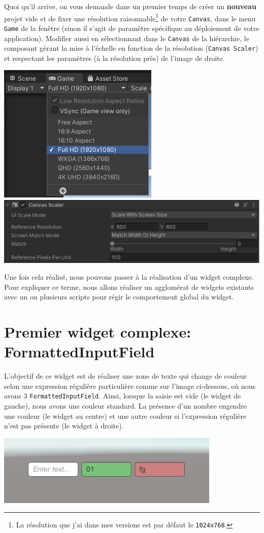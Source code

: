 \documentclass[a4paper,10pt]{article}
\begin{document}
Quoi qu'il arrive, on vous demande dans un premier temps de créer un \textbf{nouveau} projet vide et de fixer une résolution raisonnable\footnote{La résolution que j'ai dans mes versions est par défaut le \texttt{1024x768}.} de votre \texttt{Canvas}, dans le menu \texttt{Game} de la fenêtre (sinon il s'agit de paramètre spécifique au déploiement de votre application). Modifier aussi en sélectionnant dans le \texttt{Canvas} de la hiérarchie, le composant gérant la mise à l'échelle en fonction de la résolution (\texttt{Canvas Scaler}) et respectant les paramètres (à la résolution près) de l'image de droite.

\begin{center}
\hfill	\includegraphics[width=0.3\linewidth]{rc/unity_set_ui_resolution_game}%
\hfill	\includegraphics[width=0.6\linewidth]{rc/unity_set_ui_resolution_canvas_scaler}%
\hfill
\end{center}

Une fois cela réalisé, nous pouvons passer à la réalisation d'un widget complexe. Pour expliquer ce terme, nous allons réaliser un agglomérat de widgets existants avec un ou plusieurs scripts pour régir le comportement global du widget.

\section{Premier widget complexe: FormattedInputField}

L'objectif de ce widget est de réaliser une zone de texte qui change de couleur selon une expression régulière particulière comme sur l'image ci-dessous, où nous avons 3 \texttt{FormattedInputField}. Ainsi, lorsque la saisie est vide (le widget de gauche), nous avons une couleur standard. La présence d'un nombre engendre une couleur (le widget au centre) et une autre couleur si l'expression régulière n'est pas présente (le widget à droite).
\begin{center}
	\includegraphics[width=0.4\linewidth]{rc/widget_formattetinputfield_start}
\end{center}
\end{document}
